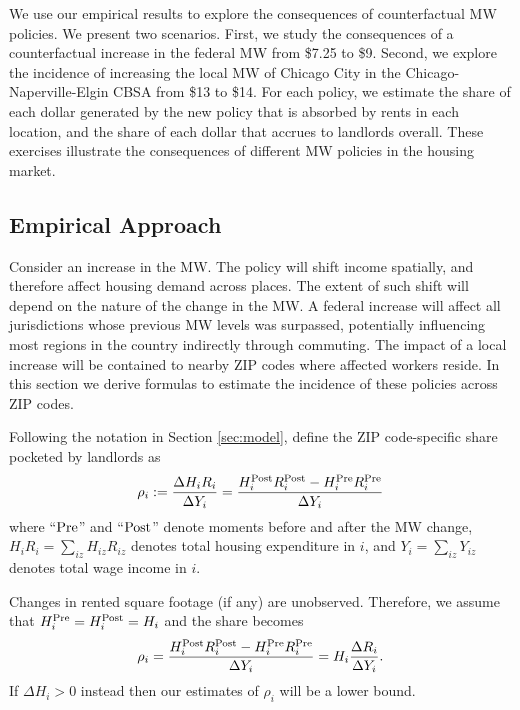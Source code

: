
We use our empirical results to explore the consequences of counterfactual 
MW policies.
We present two scenarios.
First, we study the consequences of a counterfactual increase in the federal MW
from \$7.25 to \$9.
Second, we explore the incidence of increasing the local MW of Chicago City in 
the Chicago-Naperville-Elgin CBSA from \$13 to \$14.
For each policy, we estimate the share of each dollar generated by the new 
policy that is absorbed by rents in each location, and the share of each 
dollar that accrues to landlords overall.
These exercises illustrate the consequences of different MW policies in the 
housing market.

\subsection{Empirical Approach}\label{sec:emp_cf}

Consider an increase in the MW.
The policy will shift income spatially, and therefore affect housing demand
across places.
The extent of such shift will depend on the nature of the change in the MW.
A federal increase will affect all jurisdictions whose previous MW levels was 
surpassed, potentially influencing most regions in the country indirectly 
through commuting.
The impact of a local increase will be contained to nearby ZIP codes where 
affected workers reside.
In this section we derive formulas to estimate the incidence of these 
policies across ZIP codes.

Following the notation in Section \ref{sec:model}, define the ZIP code-specific 
share pocketed by landlords as
\begin{equation*}
    \rho_i := \frac{\Delta H_i R_i}{\Delta Y_i} 
            = \frac{H^{\text{Post}}_i R^{\text{Post}}_i - H^{\text{Pre}}_i R^{\text{Pre}}_i}{\Delta Y_i} 
\end{equation*}
where
``$\text{Pre}$'' and ``$\text{Post}$'' denote moments before and after the MW change,
$H_i R_i = \sum_{iz} H_{iz} R_{iz}$ denotes total housing expenditure in $i$, and
$Y_i = \sum_{iz} Y_{iz}$ denotes total wage income in $i$.

Changes in rented square footage (if any) are unobserved.
Therefore, we assume that
$H^{\text{Pre}}_i = H^{\text{Post}}_i = H_i$ 
and the share becomes
\begin{equation}\label{eq:share_pocketed}
    \rho_i = \frac{H^{\text{Post}}_i R^{\text{Post}}_i - H^{\text{Pre}}_i R^{\text{Pre}}_i}{\Delta Y_i} = 
                H_i \frac{\Delta R_i}{\Delta Y_i} .
\end{equation}
If $\Delta H_i > 0$ instead then our estimates of $\rho_i$ will be a lower bound.

